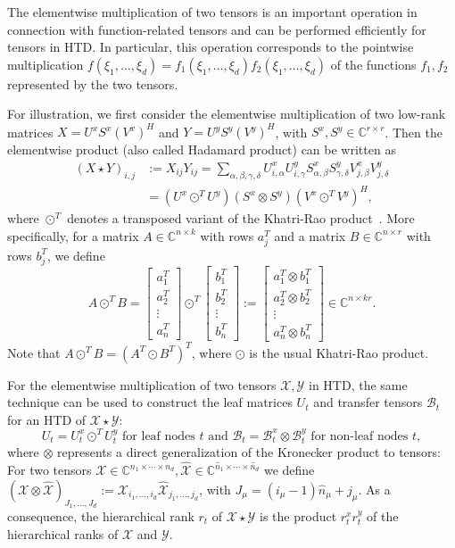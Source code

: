 \documentclass[11pt, a4paper]{article}
\newcommand{\calB}{\mathcal{B}}
\newcommand{\calX}{\mathcal{X}}
\newcommand{\calY}{\mathcal{Y}}
\newcommand{\C}{{\mathbb C}}
\renewcommand{\hat}{\widehat}
\begin{document}
The elementwise multiplication of two tensors is an important
operation in connection with function-related tensors and can be
performed efficiently for tensors in HTD.
In particular, this operation corresponds to the
pointwise multiplication $f(\xi_1, \ldots, \xi_d) = f_1(\xi_1, \ldots, \xi_d)
 f_2(\xi_1, \ldots, \xi_d)$ of the functions $f_1,f_2$ represented
  by the two tensors.

For illustration, we first consider
the elementwise multiplication of two low-rank matrices 
$X = U^x S^x (V^x)^H$ and
$Y = U^y S^y (V^y)^H$,
with $S^x, S^y \in \C^{r \times r}$.
Then the elementwise product (also called Hadamard product) can be written as
\begin{align*}
(X \star Y)_{i,j} &:= X_{ij} Y_{ij} = \sum_{\alpha,\beta,\gamma,\delta} U^x_{i,\alpha} U^y_{i,\gamma} S^x_{\alpha,\beta} S^y_{\gamma,\delta} V^x_{j,\beta} V^y_{j,\delta}\\
& = (U^x \odot^T U^y) (S^x \otimes S^y) (V^x \odot^T V^y)^H,
\end{align*}
where $\odot^T$ denotes a transposed variant of the Khatri-Rao product~\cite{KolB09}. More specifically,
for a matrix $A \in \C^{n \times k}$ with rows $a_j^T$ and
a matrix $B \in \C^{n \times r}$ with rows $b_j^T$, we define
\[
A \odot^T B =
\begin{bmatrix} a_1^T \\ a_2^T \\ \vdots \\ a_n^T \end{bmatrix} \odot^T
\begin{bmatrix} b_1^T \\ b_2^T \\ \vdots \\ b_n^T \end{bmatrix} :=
\begin{bmatrix} a_1^T \otimes b_1^T \\ a_2^T \otimes b_2^T \\
  \vdots \\ a_n^T \otimes b_n^T \end{bmatrix} \in \C^{n \times kr}.
\]
Note that
$A \odot^T
B = (A^T \odot B^T)^T$, where $\odot$ is the usual Khatri-Rao product.

For the elementwise multiplication of two tensors $\calX, \calY$ in HTD, the same technique
can be used to construct the leaf matrices $U_t$ and transfer tensors $\calB_t$
for an HTD of $\calX\star \calY$:
\[
U_t = U^x_t \odot^T U^y_t \text{ for leaf nodes $t$ and } \calB_t = \calB_t^x \otimes \calB_t^y \text{ for non-leaf nodes $t$},
\]
where $\otimes$ represents 
a direct generalization of 
the Kronecker product to tensors: 
For two tensors 
$\calX \in \C^{n_1 \times \cdots \times n_d},
\hat{\calX} \in \C^{\hat{n}_1 \times \cdots \times \hat{n}_d}$
we define
$(\calX \otimes \hat{\calX})_{J_1, \ldots, J_d} 
:= \calX_{i_1,\ldots,i_d} \hat{\calX}_{j_1,\ldots,j_d}$, 
with $J_\mu = (i_\mu-1) \hat{n}_\mu + j_\mu$.
%
As a consequence,
the hierarchical rank $r_t$ of $\calX \star \calY$
is the product $r^x_t r^y_t$ 
of the hierarchical ranks
of $\calX$ and $\calY$.
\end{document}
